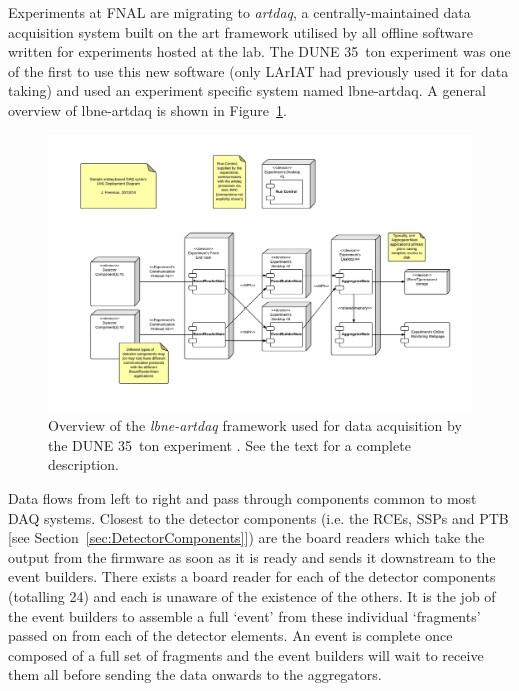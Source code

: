 Experiments at FNAL are migrating to \textit{artdaq}, a centrally-maintained data acquisition system built on the art framework utilised by all offline software written for experiments hosted at the lab.  The DUNE 35~ton experiment was one of the first to use this new software (only LArIAT had previously used it for data taking) and used an experiment specific system named lbne-artdaq.
A general overview of lbne-artdaq is shown in Figure~\ref{fig:lbne-artdaq}.

\begin{figure}
\centering
  \includegraphics[width=16cm]{artdaqFramework.pdf}
  \caption[The \textit{lbne-artdaq} framework]{Overview of the \textit{lbne-artdaq} framework used for data acquisition by the DUNE 35~ton experiment \cite{Freeman2014}.  See the text for a complete description.}
  \label{fig:lbne-artdaq}
\end{figure}

Data flows from left to right and pass through components common to most DAQ systems.  Closest to the detector components (i.e. the RCEs, SSPs and PTB [see Section~\ref{sec:DetectorComponents}]) are the board readers which take the output from the firmware as soon as it is ready and sends it downstream to the event builders.  There exists a board reader for each of the detector components (totalling 24) and each is unaware of the existence of the others.  It is the job of the event builders to assemble a full `event' from these individual `fragments' passed on from each of the detector elements.  An event is complete once composed of a full set of fragments and the event builders will wait to receive them all before sending the data onwards to the aggregators.

